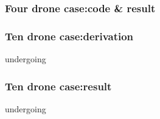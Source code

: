 \documentclass{article}
\theoremstyle{definition} %
\begin{document}
\subsubsection{Four drone case:code \& result}

\subsubsection{Ten drone case:derivation}
undergoing

\subsubsection{Ten drone case:result}
undergoing
\end{document}
